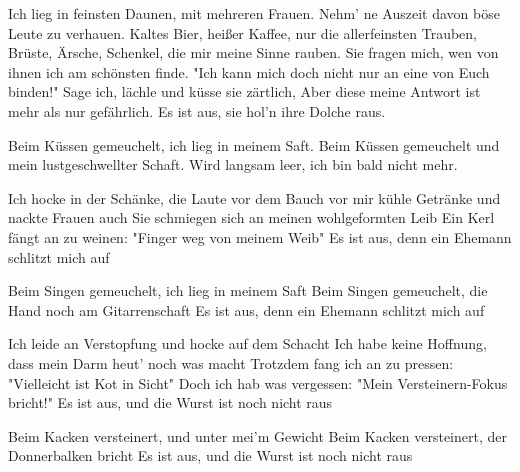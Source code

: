 \begin{guitar}
	Ich lieg in feinsten Daunen, mit mehreren Frauen.
	Nehm’ ne Auszeit davon böse Leute zu verhauen.
	Kaltes Bier, heißer Kaffee, nur die allerfeinsten Trauben,
	Brüste, Ärsche, Schenkel, die mir meine Sinne rauben.
	Sie fragen mich, wen von ihnen ich am schönsten finde.
	"Ich kann mich doch nicht nur an eine von Euch binden!"
	Sage ich, lächle und küsse sie zärtlich,
	Aber diese meine Antwort ist mehr als nur gefährlich.
	Es ist aus, sie hol’n ihre Dolche raus.
	
	Beim Küssen gemeuchelt, ich lieg in meinem Saft.
	Beim Küssen gemeuchelt und mein lustgeschwellter Schaft.
	Wird langsam leer, ich bin bald nicht mehr.
	
	 
	
	 
	
	Ich hocke in der Schänke, die Laute vor dem Bauch
	vor mir kühle Getränke und nackte Frauen auch
	Sie schmiegen sich an meinen wohlgeformten Leib
	Ein Kerl fängt an zu weinen: "Finger weg von meinem Weib"
	Es ist aus, denn ein Ehemann schlitzt mich auf
	
	Beim Singen gemeuchelt, ich lieg in meinem Saft
	Beim Singen gemeuchelt, die Hand noch am Gitarrenschaft
	Es ist aus, denn ein Ehemann schlitzt mich auf
	
	Ich leide an Verstopfung und hocke auf dem Schacht
	Ich habe keine Hoffnung, dass mein Darm heut’ noch was macht
	Trotzdem fang ich an zu pressen: "Vielleicht ist Kot in Sicht"
	Doch ich hab was vergessen: "Mein Versteinern-Fokus bricht!"
	Es ist aus, und die Wurst ist noch nicht raus
	
	Beim Kacken versteinert, und unter mei’m Gewicht
	Beim Kacken versteinert, der Donnerbalken bricht
	Es ist aus, und die Wurst ist noch nicht raus
	
	 
	
	 
		
\end{guitar}